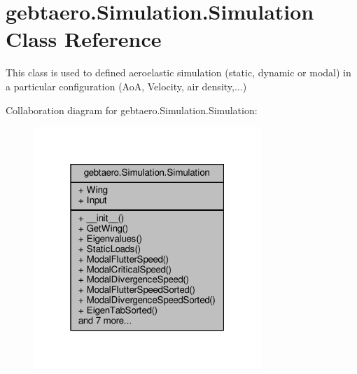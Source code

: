 \hypertarget{classgebtaero_1_1_simulation_1_1_simulation}{}\section{gebtaero.\+Simulation.\+Simulation Class Reference}
\label{classgebtaero_1_1_simulation_1_1_simulation}


This class is used to defined aeroelastic simulation (static, dynamic or modal) in a particular configuration (AoA, Velocity, air density,...)  




Collaboration diagram for gebtaero.\+Simulation.\+Simulation\+:
\nopagebreak
\begin{figure}[H]
\begin{center}
\leavevmode
\includegraphics[width=244pt]{classgebtaero_1_1_simulation_1_1_simulation__coll__graph}
\end{center}
\end{figure}
